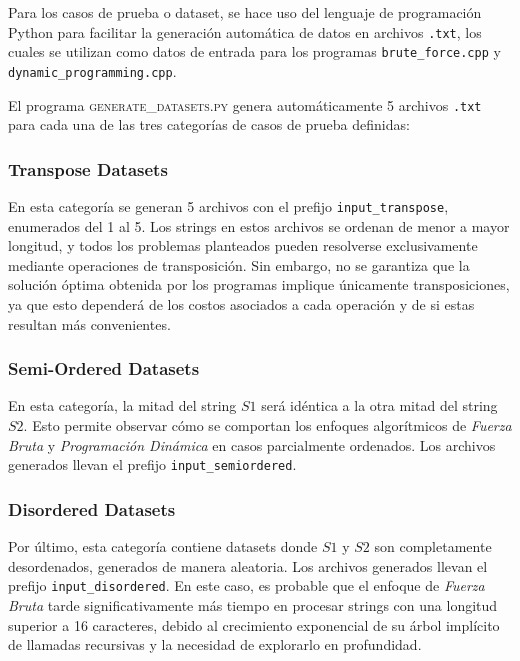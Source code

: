 Para los casos de prueba o dataset, se hace uso del lenguaje de programación Python para facilitar la generación automática de datos en archivos \texttt{.txt}, los cuales se utilizan como datos de entrada para los programas \texttt{brute\_force.cpp} y \texttt{dynamic\_programming.cpp}.

El programa \textsc{generate\_datasets.py} genera automáticamente 5 archivos \texttt{.txt} para cada una de las tres categorías de casos de prueba definidas:

\subsubsection{Transpose Datasets}
En esta categoría se generan 5 archivos con el prefijo \texttt{input\_transpose}, enumerados del 1 al 5. Los strings en estos archivos se ordenan de menor a mayor longitud, y todos los problemas planteados pueden resolverse exclusivamente mediante operaciones de transposición. Sin embargo, no se garantiza que la solución óptima obtenida por los programas implique únicamente transposiciones, ya que esto dependerá de los costos asociados a cada operación y de si estas resultan más convenientes.

\subsubsection{Semi-Ordered Datasets}
En esta categoría, la mitad del string \( S1 \) será idéntica a la otra mitad del string \( S2 \). Esto permite observar cómo se comportan los enfoques algorítmicos de \textit{Fuerza Bruta} y \textit{Programación Dinámica} en casos parcialmente ordenados. Los archivos generados llevan el prefijo \texttt{input\_semiordered}.

\subsubsection{Disordered Datasets}
Por último, esta categoría contiene datasets donde \( S1 \) y \( S2 \) son completamente desordenados, generados de manera aleatoria. Los archivos generados llevan el prefijo \texttt{input\_disordered}. En este caso, es probable que el enfoque de \textit{Fuerza Bruta} tarde significativamente más tiempo en procesar strings con una longitud superior a 16 caracteres, debido al crecimiento exponencial de su árbol implícito de llamadas recursivas y la necesidad de explorarlo en profundidad.

